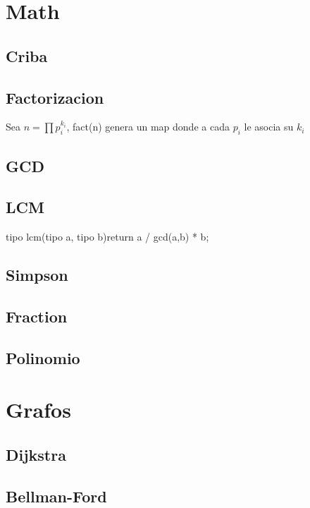 \section{Math}%
\subsection{Criba}
\subsection{Factorizacion}
Sea $n=\prod{p_i^{k_i}}$, fact(n) genera un map donde a cada $p_i$ le asocia su $k_i$
\subsection{GCD}
\subsection{LCM}
\begin{code}
tipo lcm(tipo a, tipo b){return a / gcd(a,b) * b;}
\end{code}
\subsection{Simpson}
\subsection{Fraction}
\subsection{Polinomio}


\section{Grafos}%
\subsection{Dijkstra}
\subsection{Bellman-Ford}
